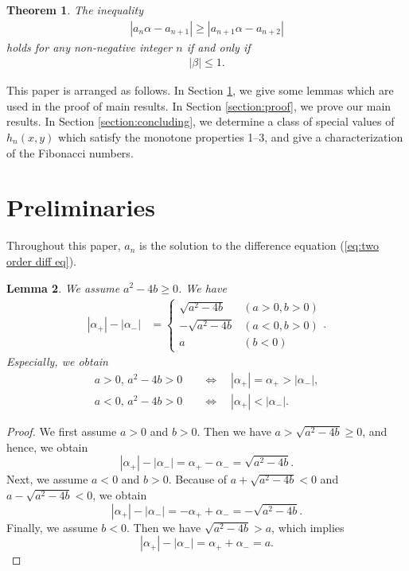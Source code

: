 \documentclass[a4paper,11pt,reqno]{amsart}
\theoremstyle{plain}
\newtheorem{thm}{Theorem}[section]
\newtheorem{lem}[thm]{Lemma}
\theoremstyle{definition}
\begin{document}
\begin{thm}
\label{thm:monot3}
The inequality 
\begin{align}
\label{eq:monot3}
\left|a_{n}\alpha -a_{n+1}\right| \geq \left|a_{n+1}\alpha -a_{n+2}\right|
\end{align}
holds for any non-negative integer $n$ if and only if
\begin{align}
\label{eq:cond3}
|\beta |\leq 1.
\end{align}
\end{thm}

This paper is arranged as follows. 
In Section \ref{section:preliminaries}, 
we give some lemmas which are used in the proof of main results. 
In Section \ref{section:proof}, 
we prove our main results. 
In Section \ref{section:concluding},
we determine a class of special values of $h_n(x,y)$ which satisfy
the monotone properties 1--3, 
and give a characterization of the Fibonacci numbers. 



\section{Preliminaries}\label{section:preliminaries}
Throughout this paper, $a_{n}$ is the solution to the difference equation (\ref{eq:two order diff eq}). 
\begin{lem}
\label{thm:charact roots ineq}
We assume $a^{2}-4b\geq 0$. We have  
\begin{align*}
|\alpha _{+}|-|\alpha _{-}|
   &=
   \begin{cases}
   \sqrt{a^{2}-4b} & (a>0, b>0) \\
   -\sqrt{a^{2}-4b} & (a<0, b>0) \\
   a & (b<0)
   \end{cases}.
\end{align*}
Especially, we obtain 
\begin{align}
\label{eq:alpha ineq}
a>0, \, a^{2}-4b>0 \quad &\Leftrightarrow \quad |\alpha _{+}|=\alpha _{+}>|\alpha _{-}|, \\
\label{eq:alpha ineq2}
a<0, \, a^{2}-4b>0 \quad &\Leftrightarrow \quad |\alpha _{+}|<|\alpha _{-}|.
\end{align}
\end{lem}
\begin{proof}
We first assume $a>0$ and $b>0$. Then we have $a>\sqrt{a^{2}-4b}\geq 0$, and hence, we obtain
$$
|\alpha _{+}|-|\alpha _{-}|
   =
   \alpha _{+}-\alpha _{-}
   =
   \sqrt{a^{2}-4b}.
$$
Next, we assume $a<0$ and $b>0$. Because of $a+\sqrt{a^{2}-4b}<0$ and $a-\sqrt{a^{2}-4b}<0$, we obtain 
$$
|\alpha _{+}|-|\alpha _{-}|
   =
   -\alpha _{+}+\alpha _{-}
   =
   -\sqrt{a^{2}-4b}.
$$
Finally, we assume $b<0$. Then we have $\sqrt{a^{2}-4b}>a$, which implies 
$$
|\alpha _{+}|-|\alpha _{-}|
   =
   \alpha _{+}+\alpha _{-}
   =
   a.
$$
\end{proof}
\end{document}
